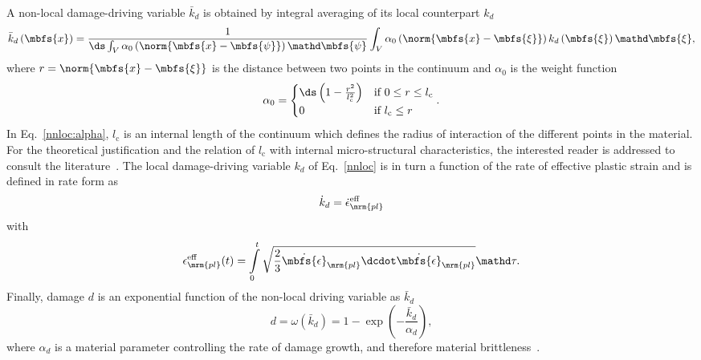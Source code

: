 A non-local damage-driving variable $\bar{k}_d$ is obtained by integral averaging of its local counterpart $k_d$
\begin{equation}\label{nnloc}
\begin{split}
\bar{k}_d\left( \mbfs{x} \right)=\frac{1}{\ds\int_{V} \alpha_0 \left( \norm{\mbfs{x}-\mbfs{\psi}} \right) \mathd\mbfs{\psi}}
\int_{V} \alpha_0 \left( \norm{\mbfs{x}-\mbfs{\xi}} \right) k_d\left(\mbfs{\xi} \right) \mathd \mbfs{\xi}, 
\end{split}
\end{equation}
where $r=\norm{\mbfs{x}-\mbfs{\xi}}$ is the distance between two points in the continuum and $\alpha_0$ is the weight function
\begin{equation}\label{nnloc:alpha}
\alpha_\text{0}=
\begin{cases} 
\ds \left(1-\frac{r^2}{l_{\text{c}}^2}\right) & \text{if } 0 \leq r \leq l_\text{c}  \\
0  & \text{if } l_\text{c} \leq r  \\
\end{cases}.
\end{equation}
In Eq.~\eqref{nnloc:alpha}, $l_\text{c}$ is an internal length of the continuum which defines the radius of interaction of the different points in the material. For the theoretical justification and the relation of $l_\text{c}$ with internal micro-structural characteristics, the interested reader is addressed to consult the literature~\cite{Bazant2002}. The local damage-driving variable $k_d$ of Eq.~\eqref{nnloc} is in turn a function of the rate of effective plastic strain and is defined in rate form as
\begin{equation}\label{eq:dam_dri}
\dot{k}_d=\dot{\epsilon}_\mrm{pl}^{\text{eff}}
\end{equation}
with
\begin{equation}\label{eq:eff_pl_str}
\epsilon_\mrm{pl}^{\text{eff}}(t)=\int \limits_0^t \sqrt{ \frac{2}{3} \dot{\mbfs{\epsilon}}_\mrm{pl} \dcdot \dot{\mbfs{\epsilon}}_\mrm{pl}} \mathd \tau.
\end{equation}
Finally, damage $d$ is an exponential function of the non-local driving variable as $\bar{k}_d$
\begin{equation}\label{eq:dam_equ}
d =\omega\left( \bar{k}_d \right)= 1-\exp \left( -\frac{\bar{k}_d}{\alpha_d} \right),
\end{equation}
where $\alpha_d$ is a material parameter controlling the rate of damage growth, and therefore material brittleness~\cite{Parisio2017}.


